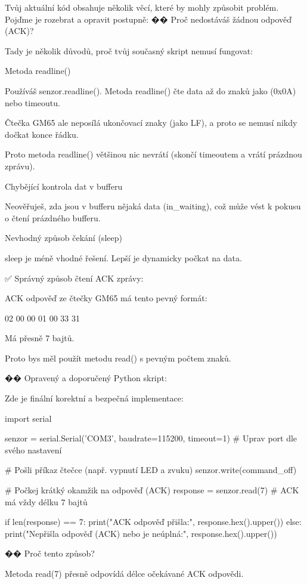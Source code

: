 Tvůj aktuální kód obsahuje několik věcí, které by mohly způsobit problém.
Pojďme je rozebrat a opravit postupně:
�� Proč nedostáváš žádnou odpověď (ACK)?

Tady je několik důvodů, proč tvůj současný skript nemusí fungovat:

    Metoda readline()

        Používáš senzor.readline(). Metoda readline() čte data až do znaků jako \n (0x0A) nebo timeoutu.

        Čtečka GM65 ale neposílá ukončovací znaky (jako LF), a proto se nemusí nikdy dočkat konce řádku.

        Proto metoda readline() většinou nic nevrátí (skončí timeoutem a vrátí prázdnou zprávu).

    Chybějící kontrola dat v bufferu

        Neověřuješ, zda jsou v bufferu nějaká data (in_waiting), což může vést k pokusu o čtení prázdného bufferu.

    Nevhodný způsob čekání (sleep)

        sleep je méně vhodné řešení. Lepší je dynamicky počkat na data.

✅ Správný způsob čtení ACK zprávy:

ACK odpověď ze čtečky GM65 má tento pevný formát:

02 00 00 01 00 33 31

    Má přesně 7 bajtů.

    Proto bys měl použít metodu read() s pevným počtem znaků.

�� Opravený a doporučený Python skript:

Zde je finální korektní a bezpečná implementace:

import serial

senzor = serial.Serial('COM3', baudrate=115200, timeout=1)  # Uprav port dle svého nastavení

# Pošli příkaz čtečce (např. vypnutí LED a zvuku)
senzor.write(command_off)

# Počkej krátký okamžik na odpověď (ACK)
response = senzor.read(7)  # ACK má vždy délku 7 bajtů

if len(response) == 7:
    print("ACK odpověď přišla:", response.hex().upper())
else:
    print("Nepřišla odpověď (ACK) nebo je neúplná:", response.hex().upper())

�� Proč tento způsob?

    Metoda read(7) přesně odpovídá délce očekávané ACK odpovědi.


